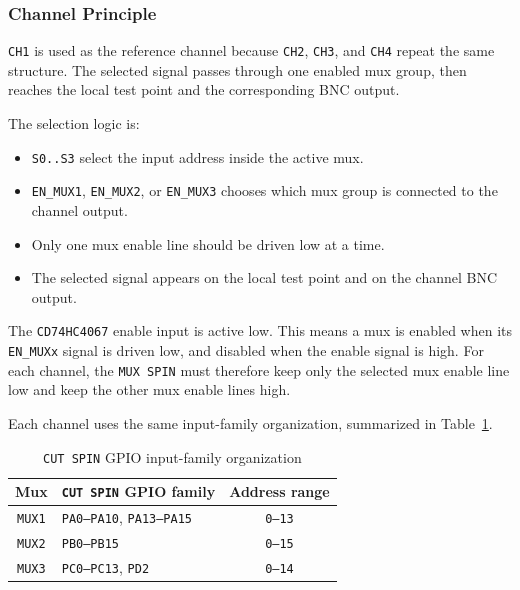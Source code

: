 \subsubsection{Channel Principle}\label{channel-principle}

\texttt{CH1} is used as the reference channel because
\texttt{CH2}, \texttt{CH3}, and \texttt{CH4} repeat the same structure.
The selected signal passes through one enabled mux group, then reaches
the local test point and the corresponding BNC output.

The selection logic is:

\begin{itemize}
\item \texttt{S0..S3} select the input address inside the active mux.
\item \texttt{EN\_MUX1}, \texttt{EN\_MUX2}, or \texttt{EN\_MUX3} chooses which mux group is connected to the channel output.
\item Only one mux enable line should be driven low at a time.
\item The selected signal appears on the local test point and on the channel BNC output.
\end{itemize}








The \texttt{CD74HC4067} enable input is active low.
This means a mux is enabled when its \texttt{EN\_MUXx} signal is driven low, and disabled when the enable signal is high. For each channel, the \texttt{MUX SPIN} must therefore keep only the selected mux enable line low and keep the other mux enable lines high.



Each channel uses the same input-family organization, summarized in
Table~\ref{tab:mux_input_family_organization}.

\begin{table}[H]
\centering
\caption{\texttt{CUT SPIN} GPIO input-family organization}
\label{tab:mux_input_family_organization}
\begin{tabular}{|c|l|c|}
\hline
\textbf{Mux} & \textbf{\texttt{CUT SPIN} GPIO family} & \textbf{Address range} \\ \hline
\texttt{MUX1} & \texttt{PA0--PA10}, \texttt{PA13--PA15} & \texttt{0--13} \\ \hline
\texttt{MUX2} & \texttt{PB0--PB15} & \texttt{0--15} \\ \hline
\texttt{MUX3} & \texttt{PC0--PC13}, \texttt{PD2} & \texttt{0--14} \\ \hline
\end{tabular}
\end{table}

